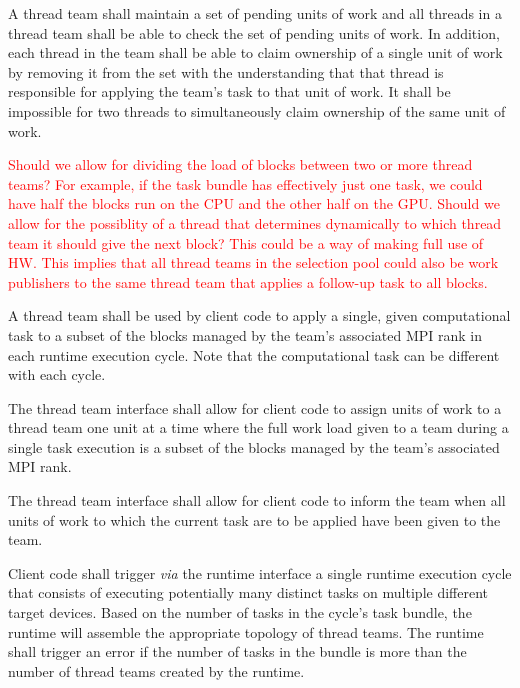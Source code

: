 \documentclass{article}
\begin{document}
\begin{req}
A thread team shall maintain a set of pending units of work and all threads in a
thread team shall be able to check the set of pending units of work.  In
addition, each thread in the team shall be able to claim ownership of a single
unit of work by removing it from the set with the understanding that that thread
is responsible for applying the team's task to that unit of work.  It shall be
impossible for two threads to simultaneously claim ownership of the same unit of
work.
\end{req}

\textcolor{red}{Should we allow for dividing the
load of blocks between two or more thread teams?  For example, if the task
bundle has effectively just one task, we could have half the blocks run on the
CPU and the other half on the GPU.  Should we allow for the possiblity of a
thread that determines dynamically to which thread team it should give the next
block?  This could be a way of making full use of HW.  This implies that all
thread teams in the selection pool could also be work publishers to the same
thread team that applies a follow-up task to all blocks.}

\begin{req}
A thread team shall be used by client code to apply a single, given
computational task to a subset of the blocks managed by the team's associated
MPI rank in each runtime execution cycle.  Note that the computational task can
be different with each cycle.
\end{req}

\begin{req}
The thread team interface shall allow for client code to assign units of
work to a thread team one unit at a time where the full work load given to a
team during a single task execution is a subset of the blocks managed by the
team's associated MPI rank.
\end{req}

\begin{req}
The thread team interface shall allow for client code to inform the team when
all units of work to which the current task are to be applied have been given to
the team.
\end{req}

\begin{req}
Client code shall trigger \textit{via} the runtime interface a single runtime
execution cycle that consists of executing potentially many distinct tasks on
multiple different target devices.  Based on the number of tasks in the cycle's
task bundle, the runtime will assemble the appropriate topology of thread teams.
The runtime shall trigger an error if the number of tasks in the bundle is more
than the number of thread teams created by the runtime.
\end{req}
\end{document}
